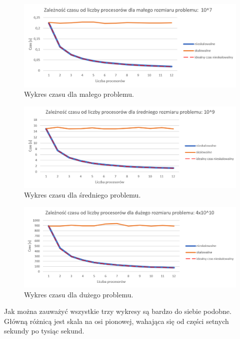 \documentclass[10pt,english, openany]{book}
\begin{document}
\begin{figure}[H]
\centering
\includegraphics[scale=0.9]{pics/small.png}
\caption{Wykres czasu dla małego problemu.}
\end{figure}

\begin{figure}[H]
\centering
\includegraphics[scale=0.9]{pics/medium.png}
\caption{Wykres czasu dla średniego problemu.}
\end{figure}

\begin{figure}[H]
\centering
\includegraphics[scale=0.9]{pics/big.png}
\caption{Wykres czasu dla dużego problemu.}
\end{figure}

Jak można zauważyć wszystkie trzy wykresy są bardzo do siebie podobne. Główną różnicą jest skala na osi pionowej, wahająca się od części setnych sekundy po tysiąc sekund. 
\end{document}
